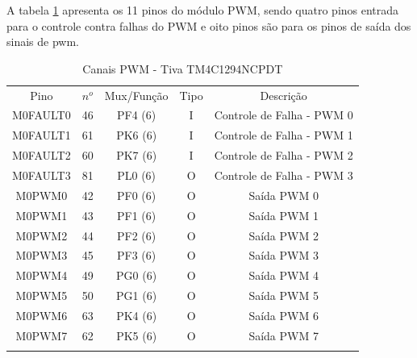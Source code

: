 A tabela \ref{tab:CanaisPWM} apresenta os 11 pinos do módulo PWM, sendo quatro pinos entrada para o controle contra falhas do PWM e oito pinos são para os pinos de saída dos sinais de pwm.  

\begin{center}
	\begin{longtable}{|c|c|c|c|c|}
		\rowcolor[HTML]{000000}
		{\color[HTML]{FFFFFF} Pino} & {\color[HTML]{FFFFFF} $n^{o}$} & {\color[HTML]{FFFFFF} Mux/Função} & {\color[HTML]{FFFFFF} Tipo} & {\color[HTML]{FFFFFF} Descrição}            \\
		M0FAULT0  & 46  & PF4 (6) & I & Controle de Falha - PWM 0\\
		M0FAULT1  & 61  & PK6 (6) & I & Controle de Falha - PWM 1\\
		M0FAULT2  & 60  & PK7 (6) & I & Controle de Falha - PWM 2\\
		M0FAULT3  & 81  & PL0 (6) & O & Controle de Falha - PWM 3\\
		M0PWM0    & 42  & PF0 (6) & O & Saída PWM 0\\
		M0PWM1    & 43  & PF1 (6) & O & Saída PWM 1\\
		M0PWM2    & 44  & PF2 (6) & O & Saída PWM 2\\
		M0PWM3    & 45  & PF3 (6) & O & Saída PWM 3\\
		M0PWM4    & 49  & PG0 (6) & O & Saída PWM 4\\
		M0PWM5    & 50  & PG1 (6) & O & Saída PWM 5\\
		M0PWM6    & 63  & PK4 (6) & O & Saída PWM 6\\
		M0PWM7    & 62  & PK5 (6) & O & Saída PWM 7\\
		\hline
		\caption{Canais PWM - Tiva TM4C1294NCPDT \cite{DATASHEET_TIVA} }
		\label{tab:CanaisPWM}
	\end{longtable}
\end{center}